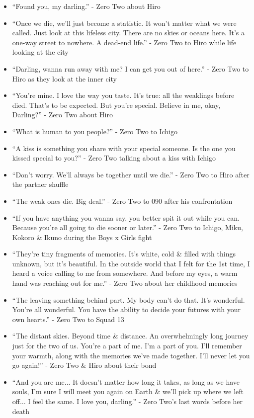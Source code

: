 \documentclass{article}
\begin{document}
\begin{enumerate}
\begin{itemize}
    	\item ``Found you, my darling.'' - Zero Two about Hiro
    	\item ``Once we die, we'll just become a statistic. It won't matter what we were called. Just look at this lifeless city. There are no skies or oceans here. It's a one-way street to nowhere. A dead-end life.'' - Zero Two to Hiro while life looking at the city
    	\item ``Darling, wanna run away with me? I can get you out of here.'' - Zero Two to Hiro as they look at the inner city
    	\item ``You're mine. I love the way you taste. It's true: all the weaklings before died. That's to be expected. But you're special. Believe in me, okay, Darling?'' - Zero Two about Hiro
    	\item ``What is human to you people?'' - Zero Two to Ichigo
    	\item ``A kiss is something you share with your special someone. Is the one you kissed special to you?'' - Zero Two talking about a kiss with Ichigo
    	\item ``Don't worry. We'll always be together until we die.'' - Zero Two to Hiro after the partner shuffle
    	\item ``The weak ones die. Big deal.'' - Zero Two to 090 after his confrontation
    	\item ``If you have anything you wanna say, you better spit it out while you can. Because you're all going to die sooner or later.'' - Zero Two to Ichigo, Miku, Kokoro \& Ikuno during the Boys x Girls fight
    	\item ``They're tiny fragments of memories. It's white, cold \& filled with things unknown, but it's beautiful. In the outside world that I felt for the 1st time, I heard a voice calling to me from somewhere. And before my eyes, a warm hand was reaching out for me.'' - Zero Two about her childhood memories
    	\item ``The leaving something behind part. My body can't do that. It's wonderful. You're all wonderful. You have the ability to decide your futures with your own hearts.'' - Zero Two to Squad 13
    	\item ``The distant skies. Beyond time \& distance. An overwhelmingly long journey just for the two of us. You're a part of me. I'm a part of you. I'll remember your warmth, along with the memories we've made together. I'll never let you go again!'' - Zero Two \& Hiro about their bond
    	\item ``And you are me... It doesn't matter how long it takes, as long as we have souls, I'm sure I will meet you again on Earth \& we'll pick up where we left off... I feel the same. I love you, darling.'' - Zero Two's last words before her death 

\end{itemize}
\end{enumerate}
\end{document}
